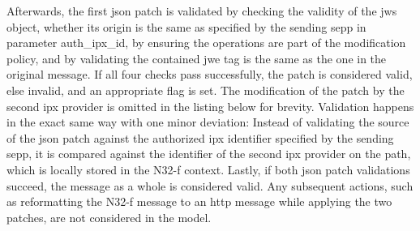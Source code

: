 Afterwards, the first \gls{json} patch is validated by checking the validity of the \gls{jws} object, whether its origin is the same as specified by the sending \gls{sepp} in parameter {\sffamily auth\_ipx\_id}, by ensuring the operations are part of the modification policy, and by validating the contained \gls{jwe} tag is the same as the one in the original message.
If all four checks pass successfully, the patch is considered valid, else invalid, and an appropriate flag is set.
The modification of the patch by the second \gls{ipx} provider is omitted in the listing below for brevity.
Validation happens in the exact same way with one minor deviation: Instead of validating the source of the \gls{json} patch against the authorized \gls{ipx} identifier specified by the sending \gls{sepp}, it is compared against the identifier of the second \gls{ipx} provider on the path, which is locally stored in the N32-f context.
Lastly, if both \gls{json} patch validations succeed, the message as a whole is considered valid.
Any subsequent actions, such as reformatting the N32-f message to an \gls{http} message while applying the two patches, are not considered in the model.

